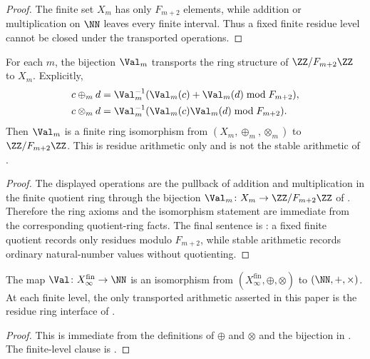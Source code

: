 \begin{proof}
The finite set \(X_m\) has only \(F_{m+2}\) elements, while addition or
multiplication on \(\NN\) leaves every finite interval.  Thus a fixed finite
residue level cannot be closed under the transported operations.
\end{proof}

\begin{proposition}
\label{prop:finite-residue-level-transport}
For each \(m\), the bijection \(\Val_m\) transports the ring structure of
\(\ZZ/F_{m+2}\ZZ\) to \(X_m\).  Explicitly,
\[
\begin{aligned}
  c\oplus_m d&=\Val_m^{-1}(\Val_m(c)+\Val_m(d)\bmod F_{m+2}),\\
  c\otimes_m d&=\Val_m^{-1}(\Val_m(c)\Val_m(d)\bmod F_{m+2}).
\end{aligned}
\]
Then \(\Val_m\) is a finite ring isomorphism from
\((X_m,\oplus_m,\otimes_m)\) to \(\ZZ/F_{m+2}\ZZ\).  This is residue arithmetic
only and is not the stable arithmetic of .
\end{proposition}

\begin{proof}
The displayed operations are the pullback of addition and multiplication in the
finite quotient ring through the bijection
\(\Val_m\colon X_m\to\ZZ/F_{m+2}\ZZ\) of
.  Therefore the ring axioms and
the isomorphism statement are immediate from the corresponding quotient-ring
facts.  The final sentence is : a fixed
finite quotient records only residues modulo \(F_{m+2}\), while stable
arithmetic records ordinary natural-number values without quotienting.
\end{proof}

\begin{theorem}
\label{thm:semiring}
The map \(\Val\colon X_\infty^{\mathrm{fin}}\to\NN\) is an isomorphism from
\((X_\infty^{\mathrm{fin}},\oplus,\otimes)\) to \((\NN,+,\times)\).  At each
finite level, the only transported arithmetic asserted in this paper is the
residue ring interface of .
\end{theorem}

\begin{proof}
This is immediate from the definitions of \(\oplus\) and \(\otimes\) and the
bijection in .  The finite-level clause
is .
\end{proof}

